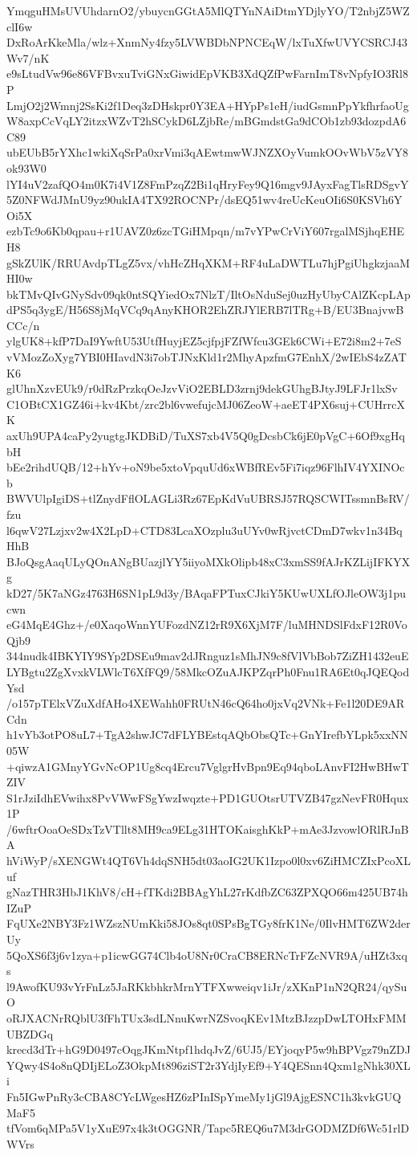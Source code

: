 YmqguHMsUVUhdarnO2/ybuycnGGtA5MlQTYnNAiDtmYDjlyYO/T2nbjZ5WZclI6w
DxRoArKkeMla/wlz+XnmNy4fzy5LVWBDbNPNCEqW/lxTuXfwUVYCSRCJ43Wv7/nK
e9sLtudVw96e86VFBvxuTviGNxGiwidEpVKB3XdQZfPwFarnImT8vNpfyIO3Rl8P
LmjO2j2Wmnj2SsKi2f1Deq3zDHskpr0Y3EA+HYpPs1eH/iudGsmnPpYkfhrfaoUg
W8axpCcVqLY2itzxWZvT2hSCykD6LZjbRe/mBGmdstGa9dCOb1zb93dozpdA6C89
ubEUbB5rYXhc1wkiXqSrPa0xrVmi3qAEwtmwWJNZXOyVumkOOvWbV5zVY8ok93W0
lYI4uV2zafQO4m0K7i4V1Z8FmPzqZ2Bi1qHryFey9Q16mgv9JAyxFagTlsRDSgvY
5Z0NFWdJMnU9yz90ukIA4TX92ROCNPr/dsEQ51wv4reUcKeuOIi6S0KSVh6YOi5X
ezbTc9o6Kb0qpau+r1UAVZ0z6zcTGiHMpqn/m7vYPwCrViY607rgalMSjhqEHEH8
gSkZUlK/RRUAvdpTLgZ5vx/vhHcZHqXKM+RF4uLaDWTLu7hjPgiUhgkzjaaMHI0w
bkTMvQIvGNySdv09qk0ntSQYiedOx7NlzT/IltOsNduSej0uzHyUbyCAlZKcpLAp
dPS5q3ygE/H56S8jMqVCq9qAnyKHOR2EhZRJYlERB7lTRg+B/EU3BnajvwBCCc/n
ylgUK8+kfP7DaI9YwftU53UtfHuyjEZ5cjfpjFZfWfcu3GEk6CWi+E72i8m2+7eS
vVMozZoXyg7YBI0HIavdN3i7obTJNxKld1r2MhyApzfmG7EnhX/2wIEbS4zZATK6
glUhnXzvEUk9/r0dRzPrzkqOeJzvViO2EBLD3zrnj9dekGUhgBJtyJ9LFJr1lxSv
C1OBtCX1GZ46i+kv4Kbt/zrc2bl6vwefujcMJ06ZeoW+aeET4PX6suj+CUHrrcXK
axUh9UPA4caPy2yugtgJKDBiD/TuXS7xb4V5Q0gDcsbCk6jE0pVgC+6Of9xgHqbH
bEe2rihdUQB/12+hYv+oN9be5xtoVpquUd6xWBfREv5Fi7iqz96FlhIV4YXINOcb
BWVUlpIgiDS+tlZnydFflOLAGLi3Rz67EpKdVuUBRSJ57RQSCWITssmnBsRV/fzu
l6qwV27Lzjxv2w4X2LpD+CTD83LcaXOzplu3uUYv0wRjvctCDmD7wkv1n34BqHhB
BJoQsgAaqULyQOnANgBUazjlYY5iiyoMXkOlipb48xC3xmSS9fAJrKZLijIFKYXg
kD27/5K7aNGz4763H6SN1pL9d3y/BAqaFPTuxCJkiY5KUwUXLfOJleOW3j1pucwn
eG4MqE4Ghz+/e0XaqoWnnYUFozdNZ12rR9X6XjM7F/luMHNDSlFdxF12R0VoQjb9
344nudk4IBKYIY9SYp2DSEu9mav2dJRnguz1sMhJN9c8fVlVbBob7ZiZH1432euE
LYBgtu2ZgXvxkVLWlcT6XfFQ9/58MkcOZuAJKPZqrPh0Fnu1RA6Et0qJQEQodYsd
/o157pTElxVZuXdfAHo4XEWahh0FRUtN46cQ64ho0jxVq2VNk+Fe1l20DE9ARCdn
h1vYb3otPO8uL7+TgA2shwJC7dFLYBEstqAQbObsQTc+GnYIrefbYLpk5xxNN05W
+qiwzA1GMnyYGvNcOP1Ug8cq4Ercu7VglgrHvBpn9Eq94qboLAnvFI2HwBHwTZIV
S1rJziIdhEVwihx8PvVWwFSgYwzIwqzte+PD1GUOtsrUTVZB47gzNevFR0Hqux1P
/6wftrOoaOeSDxTzVTllt8MH9ca9ELg31HTOKaisghKkP+mAe3JzvowlORlRJnBA
hViWyP/sXENGWt4QT6Vh4dqSNH5dt03aoIG2UK1Izpo0l0xv6ZiHMCZIxPcoXLuf
gNazTHR3HbJ1KhV8/cH+fTKdi2BBAgYhL27rKdfbZC63ZPXQO66m425UB74hIZuP
FqUXe2NBY3Fz1WZszNUmKki58JOs8qt0SPsBgTGy8frK1Ne/0IlvHMT6ZW2derUy
5QoXS6f3j6v1zya+p1icwGG74Clb4oU8Nr0CraCB8ERNcTrFZcNVR9A/uHZt3xqs
l9AwofKU93vYrFnLz5JaRKkbhkrMrnYTFXwweiqv1iJr/zXKnP1nN2QR24/qySuO
oRJXACNrRQblU3fFhTUx3sdLNnuKwrNZSvoqKEv1MtzBJzzpDwLTOHxFMMUBZDGq
krecd3dTr+hG9D0497cOqgJKmNtpf1hdqJvZ/6UJ5/EYjoqyP5w9hBPVgz79nZDJ
YQwy4S4o8nQDIjELoZ3OkpMt896ziST2r3YdjIyEf9+Y4QESnn4Qxm1gNhk30XLi
Fn5IGwPnRy3cCBA8CYcLWgesHZ6zPInISpYmeMy1jGl9AjgESNC1h3kvkGUQMaF5
tfVom6qMPa5V1yXuE97x4k3tOGGNR/Tapc5REQ6u7M3drGODMZDf6Wc51rlDWVrs
